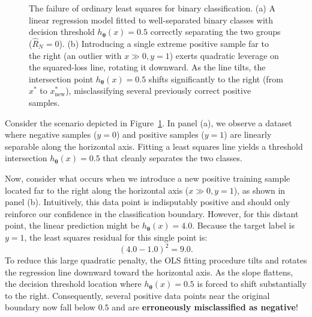 \begin{figure}[H]
\caption{The failure of ordinary least squares for binary classification. (a) A linear regression model fitted to well-separated binary classes with decision threshold $h_{\boldsymbol{\theta}}(x) = 0.5$ correctly separating the two groups ($\hat{R}_N = 0$). (b) Introducing a single extreme positive sample far to the right (an outlier with $x \gg 0, y=1$) exerts quadratic leverage on the squared-loss line, rotating it downward. As the line tilts, the intersection point $h_{\boldsymbol{\theta}}(x) = 0.5$ shifts significantly to the right (from $x^*$ to $x^*_{\text{new}}$), misclassifying several previously correct positive samples.}
\label{fig:slide_linear_reg_classification_failure}
\end{figure}

Consider the scenario depicted in Figure~\ref{fig:slide_linear_reg_classification_failure}. In panel (a), we observe a dataset where negative samples ($y=0$) and positive samples ($y=1$) are linearly separable along the horizontal axis. Fitting a least squares line yields a threshold intersection $h_{\boldsymbol{\theta}}(x) = 0.5$ that cleanly separates the two classes.

Now, consider what occurs when we introduce a new positive training sample located far to the right along the horizontal axis ($x \gg 0, y=1$), as shown in panel (b). Intuitively, this data point is indisputably positive and should only reinforce our confidence in the classification boundary. However, for this distant point, the linear prediction might be $h_{\boldsymbol{\theta}}(x) = 4.0$. Because the target label is $y = 1$, the least squares residual for this single point is:
\begin{equation}
(4.0 - 1.0)^2 = 9.0.
\end{equation}
To reduce this large quadratic penalty, the OLS fitting procedure tilts and rotates the regression line downward toward the horizontal axis. As the slope flattens, the decision threshold location where $h_{\boldsymbol{\theta}}(x) = 0.5$ is forced to shift substantially to the right. Consequently, several positive data points near the original boundary now fall below $0.5$ and are \textbf{erroneously misclassified as negative}!


